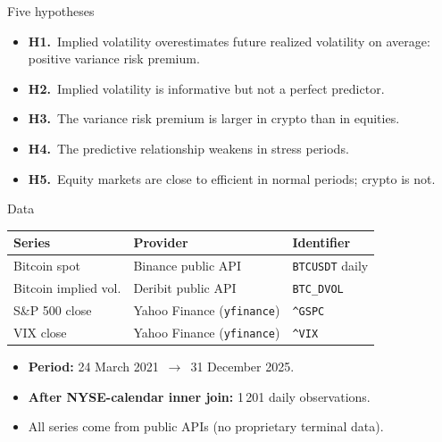 \documentclass[aspectratio=169,11pt]{beamer}
\begin{document}
\begin{frame}{Five hypotheses}
  \vspace*{3mm}
  \begin{itemize}
    \setlength\itemsep{3mm}
    \item \textbf{H1.}~Implied volatility overestimates future realized volatility on average: positive variance risk premium.
    \item \textbf{H2.}~Implied volatility is informative but not a perfect predictor.
    \item \textbf{H3.}~The variance risk premium is larger in crypto than in equities.
    \item \textbf{H4.}~The predictive relationship weakens in stress periods.
    \item \textbf{H5.}~Equity markets are close to efficient in normal periods; crypto is not.
  \end{itemize}
\end{frame}

\begin{frame}{Data}
  \vspace*{3mm}
  \begin{center}
    \small
    \begin{tabular}{lll}
      \toprule
      Series & Provider & Identifier \\
      \midrule
      Bitcoin spot          & Binance public API       & \texttt{BTCUSDT} daily \\
      Bitcoin implied vol.  & Deribit public API       & \texttt{BTC\_DVOL} \\
      S\&P 500 close        & Yahoo Finance (\texttt{yfinance}) & \texttt{\^{}GSPC} \\
      VIX close             & Yahoo Finance (\texttt{yfinance}) & \texttt{\^{}VIX} \\
      \bottomrule
    \end{tabular}
  \end{center}
  \vspace*{6mm}
  \begin{itemize}
    \item \textbf{Period:} 24 March 2021 \,$\to$\, 31 December 2025.
    \item \textbf{After NYSE-calendar inner join:} 1\,201 daily observations.
    \item All series come from public APIs (no proprietary terminal data).
  \end{itemize}
\end{frame}
\end{document}
